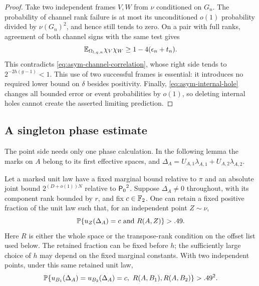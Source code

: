 \begin{proof}
Take two independent frames \(V,W\) from \(\nu\) conditioned
on \(G_n\).  The probability of channel rank failure is at most
its unconditioned \(o(1)\) probability divided by
\(\nu(G_n)^2\), and hence still tends to zero.  On a pair
with full ranks, agreement of both channel signs with the same
test gives
\[
 \mathbb E_{\Omega_{l,q,n}}\chi_V\chi_W
 \ge 1-4(\epsilon_n+t_n).
\]
This contradicts \eqref{eq:asym-channel-correlation}, whose
right side tends to \(2^{-2h(g-1)}<1\).  This use of two
successful frames is essential: it introduces no required lower
bound on \(\delta\) besides positivity.  Finally,
\eqref{eq:asym-internal-hole} changes all bounded error or event
probabilities by \(o(1)\), so deleting internal holes cannot
create the asserted limiting prediction.
\end{proof}

\subsection{A singleton phase estimate}

The point side needs only one phase calculation.  In the following
lemma the marks on \(A\) belong to its first effective spaces,
and \(\Delta_A=U_{A,1}\lambda_{A,1}+U_{A,2}\lambda_{A,2}\).

\begin{lemma}
\label{lem:asym-singleton-phase}
Let a marked unit law have a fixed marginal bound relative to
\(\pi\) and an absolute joint bound \(2^{(D+o(1))N}\)
relative to \({\mathsf P_0}^2\).  Suppose \(\Delta_A\ne0\)
throughout, with its component rank bounded by \(r\), and fix
\(c\in\mathbb F_2\).  One can retain a fixed positive fraction of
the unit law such that, for an independent point \(Z\sim\nu\),
\[
 \mathbb P\{u_Z(\Delta_A)=c\text{ and }R(A,Z)\}>.49.
\]
Here \(R\) is either the whole space or the transpose-rank
condition on the offset list used below.  The retained fraction
can be fixed before \(h\); the sufficiently large choice of
\(h\) may depend on the fixed marginal constants.  With two
independent points, under this same retained unit law,
\begin{equation}
\label{eq:asym-two-phase-bits}
 \mathbb P\{u_{B_1}(\Delta_A)=u_{B_2}(\Delta_A)=c,
                  \ R(A,B_1),R(A,B_2)\}>.49^2.
\end{equation}
\end{lemma}

